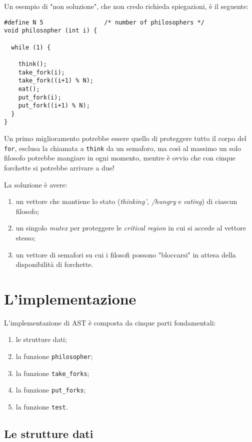 \documentclass{article}
\begin{document}
Un esempio di "non soluzione", che non credo richieda spiegazioni, è
il seguente:
\begin{verbatim}
#define N 5                 /* number of philosophers */
void philosopher (int i) {

  while (1) {

    think();
    take_fork(i);
    take_fork((i+1) % N);
    eat();
    put_fork(i);
    put_fork((i+1) % N);
  }
}
\end{verbatim}

Un primo miglioramento potrebbe essere quello di proteggere tutto il
corpo del \texttt{for}, esclusa la chiamata a \texttt{think} da un semaforo, ma
così al massimo un solo filosofo potrebbe mangiare in ogni momento,
mentre è ovvio che con cinque forchette si potrebbe arrivare a due!

La soluzione è avere:

\begin{enumerate}
\item un vettore che mantiene lo stato (\emph{thinking', /hungry} e
\emph{eating}) di ciascun filosofo;
\item un singolo \emph{mutex} per proteggere le \emph{critical region} in cui si
accede al vettore stesso;
\item un vettore di semafori su cui i filosofi possono "bloccarsi" in
attesa della disponibilità di forchette.
\end{enumerate}

\section{L'implementazione}
\label{sec-3}

L'implementazione di AST è composta da cinque parti fondamentali:

\begin{enumerate}
\item le strutture dati;
\item la funzione \texttt{philosopher};
\item la funzione \texttt{take\_forks};
\item la funzione \texttt{put\_forks};
\item la funzione \texttt{test}.
\end{enumerate}

\subsection{Le strutture dati}
\label{sec-3-1}
\end{document}
